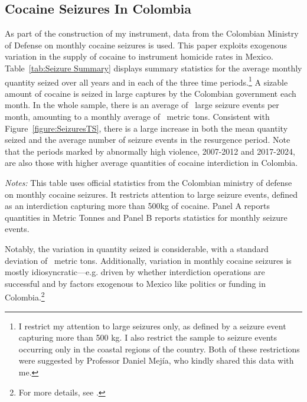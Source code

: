 \documentclass[12pt,letter,english,intoc,bibliography=totoc,index=totoc,BCOR10mm,captions=tableheading,nottitlepage,fleqn]{article}
\theoremstyle{break}
\begin{document}
\subsection{Cocaine Seizures In Colombia}
As part of the construction of my instrument, data from the Colombian Ministry of Defense on monthly cocaine seizures is used. This paper exploits exogenous variation in the supply of cocaine to instrument homicide rates in Mexico. Table~\ref{tab:Seizure Summary} displays summary statistics for the average monthly quantity seized over all years and in each of the three time periods.\footnote{I restrict my attention to large seizures only, as defined by a seizure event capturing more than 500 kg. I also restrict the sample to seizure events occurring only in the coastal regions of the country. Both of these restrictions were suggested by Professor Daniel Mej\'{i}a, who kindly shared this data with me.}  A sizable amount of cocaine is seized in large captures by the Colombian government each month. In the whole sample, there is an average of \nSeizeWholeSamp\ large seizure events per month, amounting to a monthly average of \kgSeizeWholeSamp\ metric tons. Consistent with Figure~\ref{figure:SeizuresTS}, there is a large increase in both the mean quantity seized and the average number of seizure events in the resurgence period. Note that the periods marked by abnormally high violence, 2007-2012 and 2017-2024, are also those with higher average quantities of cocaine interdiction in Colombia. 
\begin{table}[H]
\centering
\caption{Monthly Cocaine Seizures}
\label{tab:Seizure Summary}

\begin{minipage}{0.95\linewidth}
    \scriptsize \singlespacing
    \textit{Notes:} This table uses official statistics from the Colombian ministry of defense on monthly cocaine seizures. It restricts attention to large seizure events, defined as an interdiction capturing more than 500kg of cocaine. Panel A reports  quantities in Metric Tonnes and Panel B reports statistics for monthly seizure events. 
    \end{minipage}
\end{table}
Notably, the variation in quantity seized is considerable, with a standard deviation of \sdSeizeWholeSamp\ metric tons. Additionally,  variation in monthly cocaine seizures is mostly idiosyncratic---e.g. driven by whether interdiction operations are successful and by factors exogenous to Mexico like politics or funding in Colombia.\footnote{For more details, see \citet{Castillo2020}.} 
\end{document}
